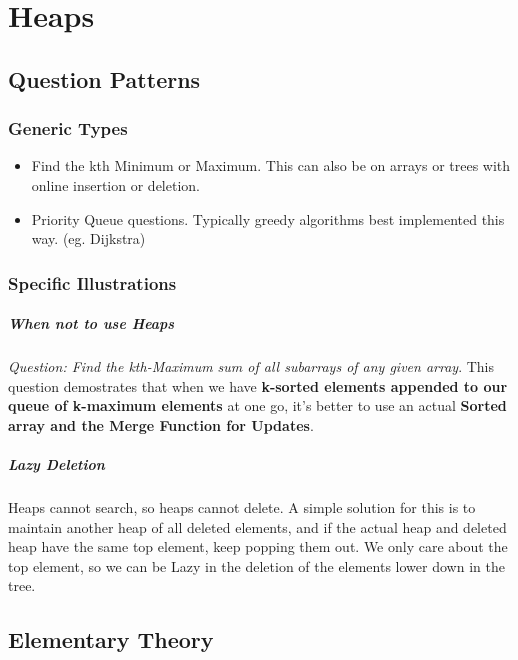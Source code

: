 \chapter{Heaps}



\section{Question Patterns}


\subsection{Generic Types}

\begin{itemize}
    \item Find the kth Minimum or Maximum. This can also be on arrays or trees with online insertion or deletion.
    \item Priority Queue questions. Typically greedy algorithms best implemented this way. (eg. Dijkstra)
\end{itemize}


\subsection{Specific Illustrations}

\paragraph{When not to use Heaps} \textit{Question: Find the kth-Maximum sum of all subarrays of any given array}. This question demostrates that when we have \textbf{k-sorted elements appended to our queue of k-maximum elements} at one go, it's better to use an actual \textbf{Sorted array and the Merge Function for Updates}.

\paragraph{Lazy Deletion} Heaps cannot search, so heaps cannot delete. A simple solution for this is to maintain another heap of all deleted elements, and if the actual heap and deleted heap have the same top element, keep popping them out. We only care about the top element, so we can be Lazy in the deletion of the elements lower down in the tree.



\section{Elementary Theory}


